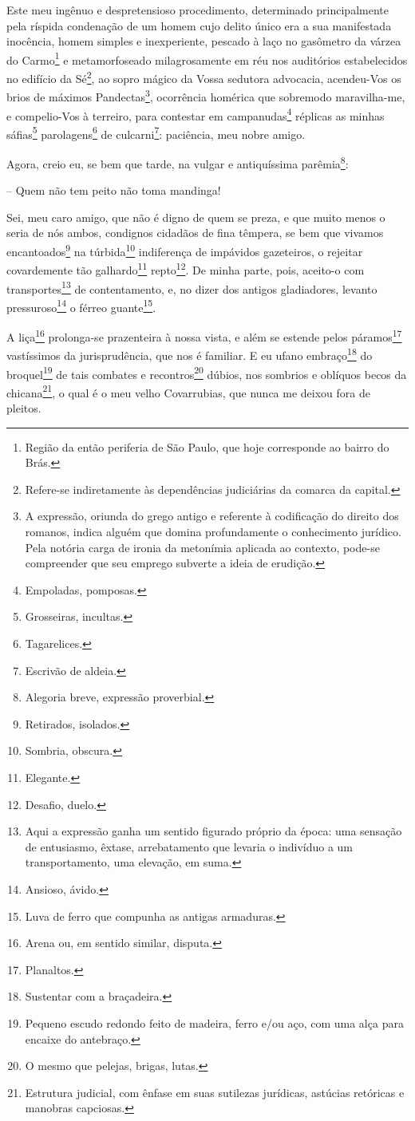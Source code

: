 Este meu ingênuo e despretensioso procedimento, determinado
principalmente pela ríspida condenação de um homem cujo delito único era
a sua manifestada inocência, homem simples e inexperiente, pescado à
laço no gasômetro da várzea do Carmo\footnote{ Região da então
  periferia de São Paulo, que hoje corresponde ao bairro do Brás.} e
metamorfoseado milagrosamente em réu nos auditórios estabelecidos no
edifício da Sé\footnote{ Refere-se indiretamente às dependências
  judiciárias da comarca da capital.}, ao sopro mágico da Vossa sedutora
advocacia, acendeu-Vos os brios de máximos Pandectas\footnote{ A
  expressão, oriunda do grego antigo e referente à codificação do
  direito dos romanos, indica alguém que domina profundamente o
  conhecimento jurídico. Pela notória carga de ironia da metonímia
  aplicada ao contexto, pode-se compreender que seu emprego subverte a
  ideia de erudição.}, ocorrência homérica que sobremodo maravilha-me, e
compelio-Vos à terreiro, para contestar em campanudas\footnote{
  Empoladas, pomposas.} réplicas as minhas sáfias\footnote{ Grosseiras,
  incultas.} parolagens\footnote{ Tagarelices.} de culcarni\footnote{
  Escrivão de aldeia.}: paciência, meu nobre amigo.

Agora, creio eu, se bem que tarde, na vulgar e antiquíssima
parêmia\footnote{ Alegoria breve, expressão proverbial.}:

-- Quem não tem peito não toma mandinga!

Sei, meu caro amigo, que não é digno de quem se preza, e que muito menos
o seria de nós ambos, condignos cidadãos de fina têmpera, se bem que
vivamos encantoados\footnote{ Retirados, isolados.} na
túrbida\footnote{ Sombria, obscura.} indiferença de impávidos
gazeteiros, o rejeitar covardemente tão galhardo\footnote{ Elegante.}
repto\footnote{ Desafio, duelo.}. De minha parte, pois, aceito-o com
transportes\footnote{ Aqui a expressão ganha um sentido figurado
  próprio da época: uma sensação de entusiasmo, êxtase, arrebatamento
  que levaria o indivíduo a um transportamento, uma elevação, em suma.}
de contentamento, e, no dizer dos antigos gladiadores, levanto
pressuroso\footnote{ Ansioso, ávido.} o férreo guante\footnote{ Luva
  de ferro que compunha as antigas armaduras.}.

A liça\footnote{ Arena ou, em sentido similar, disputa.} prolonga-se
prazenteira à nossa vista, e além se estende pelos páramos\footnote{
  Planaltos.} vastíssimos da jurisprudência, que nos é familiar. E eu
ufano embraço\footnote{ Sustentar com a braçadeira.} do
broquel\footnote{ Pequeno escudo redondo feito de madeira, ferro e/ou
  aço, com uma alça para encaixe do antebraço.} de tais combates e
recontros\footnote{ O mesmo que pelejas, brigas, lutas.} dúbios, nos
sombrios e oblíquos becos da chicana\footnote{ Estrutura judicial, com
  ênfase em suas sutilezas jurídicas, astúcias retóricas e manobras
  capciosas.}, o qual é o meu velho Covarrubias, que nunca me deixou
fora de pleitos.

